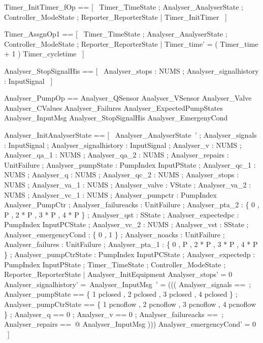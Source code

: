 \documentclass{article}
\begin{document}
\begin{zed}
	Timer\_InitTimer\_fOp == [~  \Xi Timer\_TimeState ; \Xi Analyser\_AnalyserState ; \Xi Controller\_ModeState ; \Xi Reporter\_ReporterState | \lnot \pre Timer\_InitTimer  ~]
\end{zed}

\begin{zed}
	Timer\_AssgnOp1 == [~  \Delta Timer\_TimeState ; \Xi Analyser\_AnalyserState ; \Xi Controller\_ModeState ; \Xi Reporter\_ReporterState | Timer\_time' = ( Timer\_time + 1 ) \mod Timer\_cycletime  ~]
\end{zed}

\begin{zed}
	Analyser\_StopSignalHis == [~  Analyser\_stops : NUMS ; Analyser\_signalhistory : \power InputSignal  ~]
\end{zed}

\begin{zed}
	Analyser\_PumpOp == \Xi Analyser\_QSensor \land \Xi Analyser\_VSensor \land \Xi Analyser\_Valve \land \Xi Analyser\_CValues \land \Xi Analyser\_Failures \land \Xi Analyser\_ExpectedPumpStates \land \Xi Analyser\_InputMsg \land \Xi Analyser\_StopSignalHis \land \Xi Analyser\_EmergenyCond
\end{zed}

\begin{zed}
    Analyser\_InitAnalyserState == [~  Analyser\_AnalyserState~' ; Analyser\_signals : \power InputSignal ; Analyser\_signalhistory : \power InputSignal ; Analyser\_v : NUMS ; Analyser\_qa\_1 : NUMS ; Analyser\_qa\_2 : NUMS ; Analyser\_repairs : \power UnitFailure ; Analyser\_pumpState : PumpIndex \fun InputPState ; Analyser\_qc\_1 : NUMS ; Analyser\_q : NUMS ; Analyser\_qc\_2 : NUMS ; Analyser\_stops : NUMS ; Analyser\_va\_1 : NUMS ; Analyser\_valve : VState ; Analyser\_va\_2 : NUMS ; Analyser\_vc\_1 : NUMS ; Analyser\_pumpctr : PumpIndex \fun Analyser\_PumpCtr ; Analyser\_failureacks : \power UnitFailure ; Analyser\_pta\_2 : \{ 0 , P , 2 * P , 3 * P , 4 * P \} ; Analyser\_qst : SState ; Analyser\_expectedpc : PumpIndex \fun InputPCState ; Analyser\_vc\_2 : NUMS ; Analyser\_vst : SState ; Analyser\_emergencyCond : \{ 0 , 1 \} ; Analyser\_noacks : \power UnitFailure ; Analyser\_failures : \power UnitFailure ; Analyser\_pta\_1 : \{ 0 , P , 2 * P , 3 * P , 4 * P \} ; Analyser\_pumpCtrState : PumpIndex \fun InputPCState ; Analyser\_expectedp : PumpIndex \fun InputPState ; \Xi Timer\_TimeState ; \Xi Controller\_ModeState ; \Xi Reporter\_ReporterState | Analyser\_InitEquipment \land Analyser\_stops' = 0 \land Analyser\_signalhistory' =~\emptyset[InputSignal] \land \theta Analyser\_InputMsg~' = ((( \LET Analyser\_signals ==~\emptyset[InputSignal] ; Analyser\_pumpState == \{ 1 \mapsto pclosed , 2 \mapsto pclosed , 3 \mapsto pclosed , 4 \mapsto pclosed \} ; Analyser\_pumpCtrState == \{ 1 \mapsto pcnoflow , 2 \mapsto pcnoflow , 3 \mapsto pcnoflow , 4 \mapsto pcnoflow \} ; Analyser\_q == 0 ; Analyser\_v == 0 ; Analyser\_failureacks ==~\emptyset[UnitFailure] ; Analyser\_repairs ==~\emptyset[UnitFailure] @ \theta Analyser\_InputMsg ))) \land Analyser\_emergencyCond' = 0  ~]
\end{zed}
\end{document}
